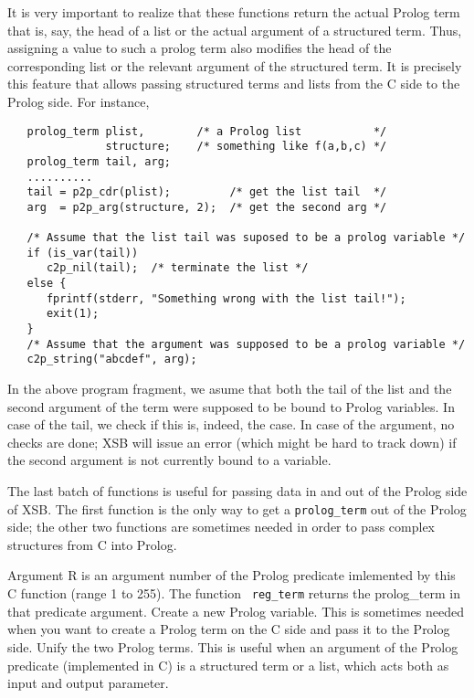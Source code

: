 It is very important to realize that these functions return the actual
Prolog term that is, say, the head of a list or the actual argument of a
structured term. Thus, assigning a value to such a prolog term also
modifies the head of the corresponding list or the relevant argument of the
structured term. It is precisely this feature that allows passing
structured terms and lists from the C side to the Prolog side.
For instance, 
\begin{verbatim}
   prolog_term plist,        /* a Prolog list           */
               structure;    /* something like f(a,b,c) */
   prolog_term tail, arg;
   ..........
   tail = p2p_cdr(plist);         /* get the list tail  */
   arg  = p2p_arg(structure, 2);  /* get the second arg */

   /* Assume that the list tail was suposed to be a prolog variable */
   if (is_var(tail))
      c2p_nil(tail);  /* terminate the list */
   else {
      fprintf(stderr, "Something wrong with the list tail!");
      exit(1);
   }
   /* Assume that the argument was supposed to be a prolog variable */
   c2p_string("abcdef", arg);
\end{verbatim}

In the above program fragment, we asume that both the tail of the list and
the second argument of the term were supposed to be bound to Prolog variables.
In case of the tail, we check if this is, indeed, the case. In case of the
argument, no checks are done; XSB will issue an error (which might be hard
to track down) if the second argument is not currently bound to a variable.

The last batch of functions is useful for passing data in and out of the
Prolog side of XSB. The first function is the only way to get a
{\tt prolog\_term} out of the Prolog side; the other two functions are
sometimes needed in order to pass complex structures from C into Prolog.
\begin{description}
   
    Argument R is an argument number of the Prolog predicate imlemented by
    this C function (range 1 to 255). The function {\tt
    reg\_term} returns the prolog\_term in that predicate argument.
 
    Create a new Prolog variable. This is sometimes needed when you want to
    create a Prolog term on the C side and pass it to the Prolog side.
    Unify the two Prolog terms. This is useful when an argument of the
    Prolog predicate (implemented in C) is a structured term or a list,
    which acts both as input and output parameter.
\end{description}

